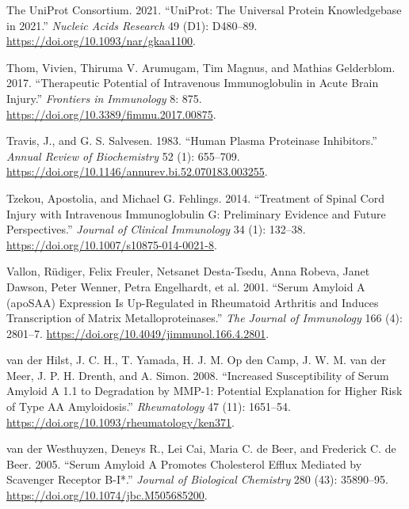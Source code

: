 \documentclass[9pt,lineno]{elife}
\newlength{\cslhangindent}
\newlength{\cslentryspacingunit} %
\newenvironment{CSLReferences}[2] %
 {%
  \setlength{\parindent}{0pt}
  \ifodd #1
  \let\oldpar\par
  \def\par{\hangindent=\cslhangindent\oldpar}
  \fi
  \setlength{\parskip}{#2\cslentryspacingunit}
 }%
 {}
\begin{document}
\begin{CSLReferences}{1}{0}
\leavevmode{}%
The UniProt Consortium. 2021. {``{UniProt}: The Universal Protein Knowledgebase in 2021.''} \emph{Nucleic Acids Research} 49 (D1): D480--89. \url{https://doi.org/10.1093/nar/gkaa1100}.

\leavevmode{}%
Thom, Vivien, Thiruma V. Arumugam, Tim Magnus, and Mathias Gelderblom. 2017. {``Therapeutic {Potential} of {Intravenous Immunoglobulin} in {Acute Brain Injury}.''} \emph{Frontiers in Immunology} 8: 875. \url{https://doi.org/10.3389/fimmu.2017.00875}.

\leavevmode{}%
Travis, J., and G. S. Salvesen. 1983. {``Human Plasma Proteinase Inhibitors.''} \emph{Annual Review of Biochemistry} 52 (1): 655--709. \url{https://doi.org/10.1146/annurev.bi.52.070183.003255}.

\leavevmode{}%
Tzekou, Apostolia, and Michael G. Fehlings. 2014. {``Treatment of {Spinal Cord Injury} with {Intravenous Immunoglobulin G}: {Preliminary Evidence} and {Future Perspectives}.''} \emph{Journal of Clinical Immunology} 34 (1): 132--38. \url{https://doi.org/10.1007/s10875-014-0021-8}.

\leavevmode{}%
Vallon, Rüdiger, Felix Freuler, Netsanet Desta-Tsedu, Anna Robeva, Janet Dawson, Peter Wenner, Petra Engelhardt, et al. 2001. {``Serum {Amyloid A} ({apoSAA}) {Expression Is Up-Regulated} in {Rheumatoid Arthritis} and {Induces Transcription} of {Matrix Metalloproteinases}.''} \emph{The Journal of Immunology} 166 (4): 2801--7. \url{https://doi.org/10.4049/jimmunol.166.4.2801}.

\leavevmode{}%
van der Hilst, J. C. H., T. Yamada, H. J. M. Op den Camp, J. W. M. van der Meer, J. P. H. Drenth, and A. Simon. 2008. {``Increased Susceptibility of Serum Amyloid {A} 1.1 to Degradation by {MMP-1}: Potential Explanation for Higher Risk of Type {AA} Amyloidosis.''} \emph{Rheumatology} 47 (11): 1651--54. \url{https://doi.org/10.1093/rheumatology/ken371}.

\leavevmode{}%
van der Westhuyzen, Deneys R., Lei Cai, Maria C. de Beer, and Frederick C. de Beer. 2005. {``Serum {Amyloid A Promotes Cholesterol Efflux Mediated} by {Scavenger Receptor B-I}*.''} \emph{Journal of Biological Chemistry} 280 (43): 35890--95. \url{https://doi.org/10.1074/jbc.M505685200}.


\end{CSLReferences}
\end{document}
